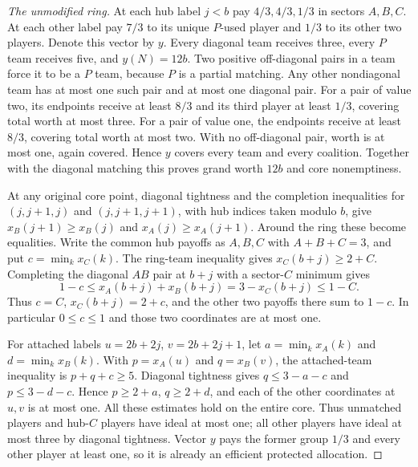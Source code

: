 \documentclass[11pt]{article}
\theoremstyle{remark}
\begin{document}
\begin{proof}[The unmodified ring]
At each hub label $j<b$ pay $4/3,4/3,1/3$ in sectors $A,B,C$.
At each other label pay $7/3$ to its unique $P$-used player and $1/3$
to its other two players. Denote this vector by $y$. Every diagonal
team receives three, every $P$ team receives five, and $y(N)=12b$.
Two positive off-diagonal pairs in a team force it to be a $P$ team,
because $P$ is a partial matching. Any other nondiagonal team has at
most one such pair and at most one diagonal pair. For a pair of value
two, its endpoints receive at least $8/3$ and its third player at least
$1/3$, covering total worth at most three. For a pair of value one,
the endpoints receive at least $8/3$, covering total worth at most two.
With no off-diagonal pair, worth is at most one, again covered. Hence
$y$ covers every team and every coalition. Together with the diagonal
matching this proves grand worth $12b$ and core nonemptiness.

At any original core point, diagonal tightness and the completion
inequalities for $(j,j+1,j)$ and $(j,j+1,j+1)$, with hub indices taken
modulo $b$, give $x_B(j+1)\ge x_B(j)$ and $x_A(j)\ge x_A(j+1)$.
Around the ring these become equalities. Write the common hub payoffs
as $A,B,C$ with $A+B+C=3$, and put $c=\min_k x_C(k)$.
The ring-team inequality gives $x_C(b+j)\ge2+C$.
Completing the diagonal $AB$ pair at $b+j$ with a sector-$C$ minimum
gives
\[
       1-c\le x_A(b+j)+x_B(b+j)=3-x_C(b+j)\le1-C.
\]
Thus $c=C$, $x_C(b+j)=2+c$, and the other two payoffs there sum to
$1-c$. In particular $0\le c\le1$ and those two coordinates are at
most one.

For attached labels $u=2b+2j$, $v=2b+2j+1$, let
$a=\min_kx_A(k)$ and $d=\min_kx_B(k)$. With $p=x_A(u)$ and
$q=x_B(v)$, the attached-team inequality is $p+q+c\ge5$.
Diagonal tightness gives $q\le3-a-c$ and $p\le3-d-c$.
Hence $p\ge2+a$, $q\ge2+d$, and each of the other coordinates at
$u,v$ is at most one. All these estimates hold on the entire core.
Thus unmatched players and hub-$C$ players have ideal at most one;
all other players have ideal at most three by diagonal tightness.
Vector $y$ pays the former group $1/3$ and every other player at least
one, so it is already an efficient protected allocation.
\end{proof}
\end{document}
